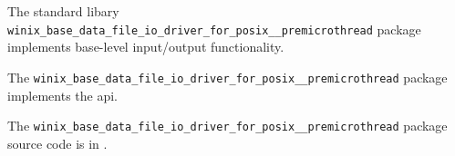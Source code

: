 
The standard libary {\tt winix\_base\_data\_file\_io\_driver\_for\_posix\_\_premicrothread} package implements base-level input/output functionality.

The {\tt winix\_base\_data\_file\_io\_driver\_for\_posix\_\_premicrothread} package implements the  api.

The {\tt winix\_base\_data\_file\_io\_driver\_for\_posix\_\_premicrothread} package source code is in .



